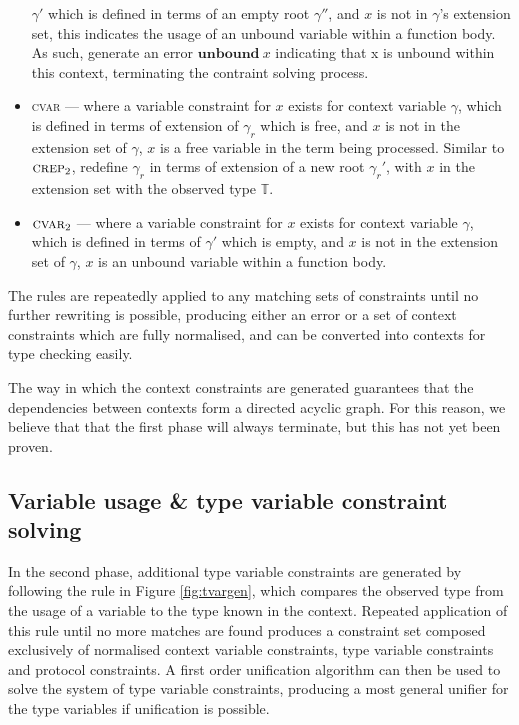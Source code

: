 \documentclass[preprint]{sigplanconf}
\newcommand{\figref}[1]{Figure \ref{#1}}
\begin{document}
\begin{itemize}
$\gamma'$ which is defined in terms of an empty root $\gamma''$,
and $x$ is not in $\gamma$'s extension set, this indicates the usage
of an unbound variable within a function body. As such, generate an
error $\mathbf{unbound}\:x$ indicating that x is unbound within this
context, terminating the contraint solving process.
\item \textsc{cvar} --- where a variable constraint for $x$ exists
for context variable $\gamma$, which is defined in terms of
extension of $\gamma_r$ which is free, and $x$ is not in the extension
set of $\gamma$, $x$ is a free variable in the term being processed. 
Similar to $\textsc{crep}_2$, redefine $\gamma_r$
in terms of extension of a new root $\gamma_r'$, with $x$ in
the extension set with the observed type $\mathbb{T}$.
\item $\textsc{cvar}_2$ --- where a variable constraint for $x$ exists
for context variable $\gamma$, which is defined in terms of $\gamma'$
which is empty, and $x$ is not in the extension set of $\gamma$, 
$x$ is an unbound variable within a function body.
\end{itemize}

The rules are repeatedly applied to any matching sets of constraints
until no further rewriting is possible, producing either an error
or a set of context constraints which are fully normalised, and
can be converted into contexts for type checking easily.

The way in which the context constraints are generated guarantees
that the dependencies between contexts form a directed acyclic graph. For
this reason, we believe that that the first phase will always terminate,
but this has not yet been proven.

\subsection{Variable usage \& type variable constraint solving}

In the second phase, additional type variable 
constraints are generated by following the rule in \figref{fig:tvargen}, which
compares the observed type from the usage of a variable to the type
known in the context. Repeated application of this rule until no more matches
are found produces a constraint set composed exclusively of normalised
context variable constraints, type variable constraints and protocol
constraints. A first order unification algorithm can then be used to solve
the system of type variable constraints, producing a most general unifier
for the type variables if unification is possible.
\end{document}
